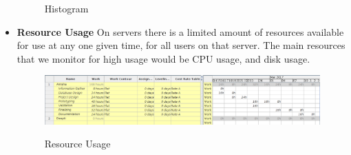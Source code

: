 \begin{itemize}
\begin{figure}[!ht]
\label{fig:image1}
\caption{Histogram}
\end{figure}
\item\textbf{Resource Usage}
On servers there is a limited amount of resources available for use at any one given time, for all users on that server. The main resources that we monitor for high usage would be CPU usage, and disk usage.


\begin{figure}[!ht]
\centering
\includegraphics[width=1\linewidth]{input/images/rseu.png}
\label{fig:image1}
\caption{Resource Usage}
\end{figure}
\end{itemize}
